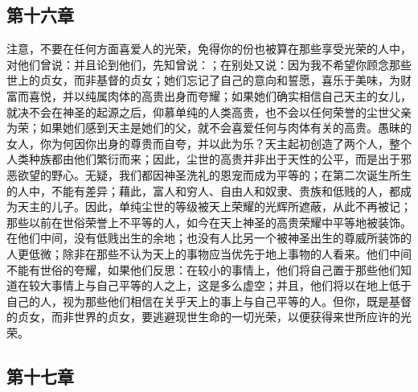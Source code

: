 
\subsection{第十六章}

注意，不要在任何方面喜爱人的光荣，免得你的份也被算在那些享受光荣的人中，对他们曾说：并且论到他们，先知曾说：；在别处又说：因为我不希望你顾念那些世上的贞女，而非基督的贞女；她们忘记了自己的意向和誓愿，喜乐于美味，为财富而喜悦，并以纯属肉体的高贵出身而夸耀；如果她们确实相信自己天主的女儿，就决不会在神圣的起源之后，仰慕单纯的人类高贵，也不会以任何荣誉的尘世父亲为荣；如果她们感到天主是她们的父，就不会喜爱任何与肉体有关的高贵。愚昧的女人，你为何因你出身的尊贵而自夸，并以此为乐？天主起初创造了两个人，整个人类种族都由他们繁衍而来；因此，尘世的高贵并非出于天性的公平，而是出于邪恶欲望的野心。无疑，我们都因神圣洗礼的恩宠而成为平等的；在第二次诞生所生的人中，不能有差异；藉此，富人和穷人、自由人和奴隶、贵族和低贱的人，都成为天主的儿子。因此，单纯尘世的等级被天上荣耀的光辉所遮蔽，从此不再被记；那些以前在世俗荣誉上不平等的人，如今在天上神圣的高贵荣耀中平等地被装饰。在他们中间，没有低贱出生的余地；也没有人比另一个被神圣出生的尊威所装饰的人更低微；除非在那些不认为天上的事物应当优先于地上事物的人看来。他们中间不能有世俗的夸耀，如果他们反思：在较小的事情上，他们将自己置于那些他们知道在较大事情上与自己平等的人之上，这是多么虚空；并且，他们将以在地上低于自己的人，视为那些他们相信在关乎天上的事上与自己平等的人。但你，既是基督的贞女，而非世界的贞女，要逃避现世生命的一切光荣，以便获得来世所应许的光荣。\par


\subsection{第十七章}

